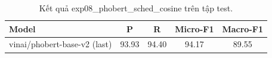 \begin{table}[t]
\centering
\begin{tabular}{lcccc}
\hline
\textbf{Model} & \textbf{P} & \textbf{R} & \textbf{Micro-F1} & \textbf{Macro-F1} \\
\hline
vinai/phobert-base-v2 (last) & 93.93 & 94.40 & 94.17 & 89.55 \\
\hline
\end{tabular}
\caption{Kết quả exp08_phobert_sched_cosine trên tập test.}
\label{tab:main}
\end{table}